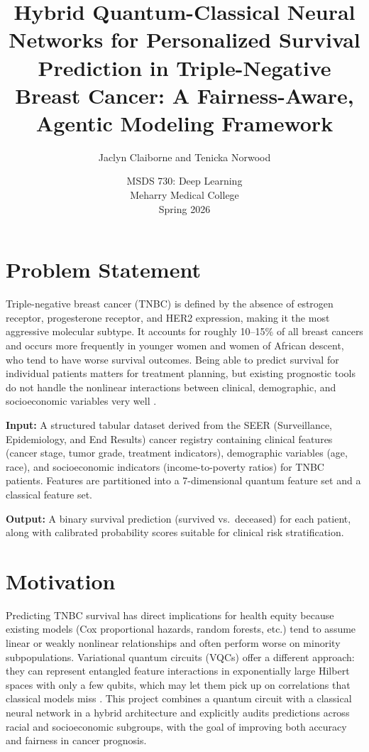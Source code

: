 \documentclass[12pt, letterpaper]{article}
\title{
    \textbf{Hybrid Quantum-Classical Neural Networks for Personalized Survival Prediction in Triple-Negative Breast Cancer: A Fairness-Aware, Agentic Modeling Framework}
}
\author{
    Jaclyn Claiborne and Tenicka Norwood
}
\date{MSDS 730: Deep Learning \\ Meharry Medical College \\ Spring 2026}
\begin{document}
\maketitle


\section{Problem Statement}

Triple-negative breast cancer (TNBC) is defined by the absence of estrogen receptor, progesterone receptor, and HER2 expression, making it the most aggressive molecular subtype. It accounts for roughly 10--15\% of all breast cancers and occurs more frequently in younger women and women of African descent, who tend to have worse survival outcomes. Being able to predict survival for individual patients matters for treatment planning, but existing prognostic tools do not handle the nonlinear interactions between clinical, demographic, and socioeconomic variables very well \citep{sandarenu2022, qiu2024}.

\textbf{Input:} A structured tabular dataset derived from the SEER (Surveillance, Epidemiology, and End Results) cancer registry containing clinical features (cancer stage, tumor grade, treatment indicators), demographic variables (age, race), and socioeconomic indicators (income-to-poverty ratios) for TNBC patients. Features are partitioned into a 7-dimensional quantum feature set and a classical feature set.

\textbf{Output:} A binary survival prediction (survived vs.\ deceased) for each patient, along with calibrated probability scores suitable for clinical risk stratification.


\section{Motivation}

Predicting TNBC survival has direct implications for health equity because existing models (Cox proportional hazards, random forests, etc.) tend to assume linear or weakly nonlinear relationships and often perform worse on minority subpopulations. Variational quantum circuits (VQCs) offer a different approach: they can represent entangled feature interactions in exponentially large Hilbert spaces with only a few qubits, which may let them pick up on correlations that classical models miss \citep{schuld2021, mcclean2018}. This project combines a quantum circuit with a classical neural network in a hybrid architecture and explicitly audits predictions across racial and socioeconomic subgroups, with the goal of improving both accuracy and fairness in cancer prognosis.
\end{document}
